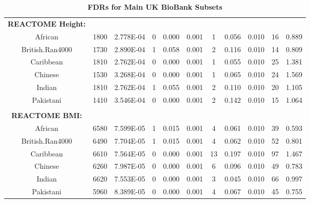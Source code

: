 \documentclass[12pt, a4paper]{article}
\begin{document}
\begin{landscape}
\begin{table}[ht]
\begin{tabular}{ccccccccccc}
  \textbf{REACTOME Height:} & & & & & & & & & \\
  African & 1800 & 2.778E-04 & 0 & 0.000 & 0.001 & 1 & 0.056 & 0.010 & 16 & 0.889 \\
  British.Ran4000 & 1730 & 2.890E-04 & 1 & 0.058 & 0.001 & 2 & 0.116 & 0.010 & 14 & 0.809 \\
  Caribbean & 1810 & 2.762E-04 & 0 & 0.000 & 0.001 & 1 & 0.055 & 0.010 & 25 & 1.381 \\
  Chinese & 1530 & 3.268E-04 & 0 & 0.000 & 0.001 & 1 & 0.065 & 0.010 & 24 & 1.569 \\
  Indian & 1810 & 2.762E-04 & 1 & 0.055 & 0.001 & 2 & 0.110 & 0.010 & 20 & 1.105 \\
  Pakistani & 1410 & 3.546E-04 & 0 & 0.000 & 0.001 & 2 & 0.142 & 0.010 & 15 & 1.064 \\
  \\
  \textbf{REACTOME BMI:} & & & & & & & & & \\
African & 6580 & 7.599E-05 & 1 & 0.015 & 0.001 & 4 & 0.061 & 0.010 & 39 & 0.593 \\
  British.Ran4000 & 6490 & 7.704E-05 & 1 & 0.015 & 0.001 & 4 & 0.062 & 0.010 & 52 & 0.801 \\
  Caribbean & 6610 & 7.564E-05 & 0 & 0.000 & 0.001 & 13 & 0.197 & 0.010 & 97 & 1.467 \\
  Chinese & 6260 & 7.987E-05 & 0 & 0.000 & 0.001 & 6 & 0.096 & 0.010 & 49 & 0.783 \\
  Indian & 6620 & 7.553E-05 & 0 & 0.000 & 0.001 & 3 & 0.045 & 0.010 & 66 & 0.997 \\
  Pakistani & 5960 & 8.389E-05 & 0 & 0.000 & 0.001 & 4 & 0.067 & 0.010 & 45 & 0.755 \\
   \hline
\end{tabular}
\caption[TBD]{\textbf{FDRs for Main UK BioBank Subsets}}
\label{InterPath-Supp-Tables-AllPops-FDRs}
\end{table}
\end{landscape}
\clearpage

\end{document}
